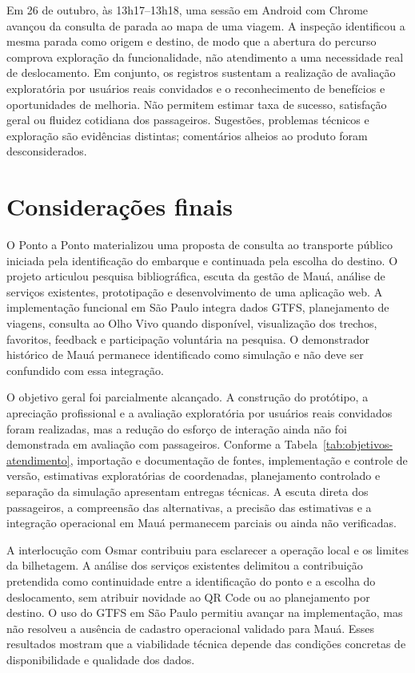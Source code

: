 \documentclass[12pt,oneside,a4paper,brazil,chapter=TITLE]{abntex2}
\begin{document}
Em 26 de outubro, às 13h17--13h18, uma sessão em Android com Chrome avançou da consulta de parada ao mapa de uma viagem. A inspeção identificou a mesma parada como origem e destino, de modo que a abertura do percurso comprova exploração da funcionalidade, não atendimento a uma necessidade real de deslocamento. Em conjunto, os registros sustentam a realização de avaliação exploratória por usuários reais convidados e o reconhecimento de benefícios e oportunidades de melhoria. Não permitem estimar taxa de sucesso, satisfação geral ou fluidez cotidiana dos passageiros. Sugestões, problemas técnicos e exploração são evidências distintas; comentários alheios ao produto foram desconsiderados.



\chapter{Considerações finais}
O Ponto a Ponto materializou uma proposta de consulta ao transporte público iniciada pela identificação do embarque e continuada pela escolha do destino. O projeto articulou pesquisa bibliográfica, escuta da gestão de Mauá, análise de serviços existentes, prototipação e desenvolvimento de uma aplicação web. A implementação funcional em São Paulo integra dados GTFS, planejamento de viagens, consulta ao Olho Vivo quando disponível, visualização dos trechos, favoritos, feedback e participação voluntária na pesquisa. O demonstrador histórico de Mauá permanece identificado como simulação e não deve ser confundido com essa integração.

O objetivo geral foi parcialmente alcançado. A construção do protótipo, a apreciação profissional e a avaliação exploratória por usuários reais convidados foram realizadas, mas a redução do esforço de interação ainda não foi demonstrada em avaliação com passageiros. Conforme a Tabela~\ref{tab:objetivos-atendimento}, importação e documentação de fontes, implementação e controle de versão, estimativas exploratórias de coordenadas, planejamento controlado e separação da simulação apresentam entregas técnicas. A escuta direta dos passageiros, a compreensão das alternativas, a precisão das estimativas e a integração operacional em Mauá permanecem parciais ou ainda não verificadas.

A interlocução com Osmar contribuiu para esclarecer a operação local e os limites da bilhetagem. A análise dos serviços existentes delimitou a contribuição pretendida como continuidade entre a identificação do ponto e a escolha do deslocamento, sem atribuir novidade ao QR Code ou ao planejamento por destino. O uso do GTFS em São Paulo permitiu avançar na implementação, mas não resolveu a ausência de cadastro operacional validado para Mauá. Esses resultados mostram que a viabilidade técnica depende das condições concretas de disponibilidade e qualidade dos dados.
\end{document}
